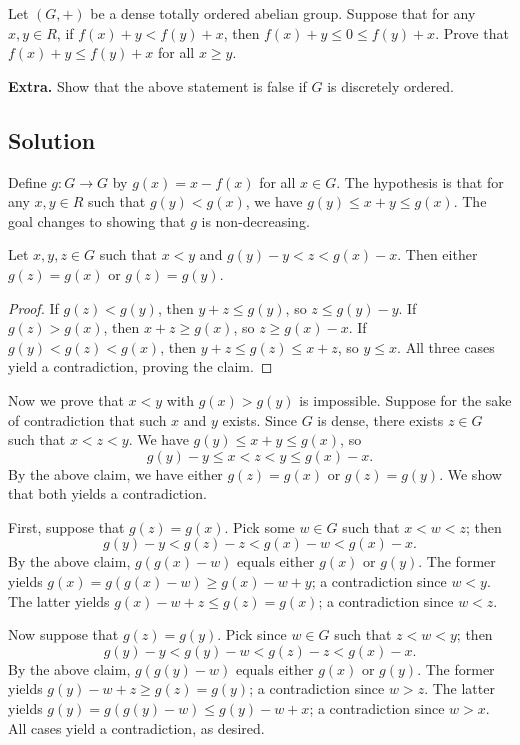 Let $(G, +)$ be a dense totally ordered abelian group.
Suppose that for any $x, y \in R$, if $f(x) + y < f(y) + x$, then $f(x) + y \leq 0 \leq f(y) + x$.
Prove that $f(x) + y \leq f(y) + x$ for all $x \geq y$.

\textbf{Extra.} Show that the above statement is false if $G$ is discretely ordered.



\subsection*{Solution}

Define $g : G \to G$ by $g(x) = x - f(x)$ for all $x \in G$.
The hypothesis is that for any $x, y \in R$ such that $g(y) < g(x)$, we have $g(y) \leq x + y \leq g(x)$.
The goal changes to showing that $g$ is non-decreasing.

\begin{claim}
Let $x, y, z \in G$ such that $x < y$ and $g(y) - y < z < g(x) - x$.
Then either $g(z) = g(x)$ or $g(z) = g(y)$.
\end{claim}
\begin{proof}
If $g(z) < g(y)$, then $y + z \leq g(y)$, so $z \leq g(y) - y$.
If $g(z) > g(x)$, then $x + z \geq g(x)$, so $z \geq g(x) - x$.
If $g(y) < g(z) < g(x)$, then $y + z \leq g(z) \leq x + z$, so $y \leq x$.
All three cases yield a contradiction, proving the claim.
\end{proof}

Now we prove that $x < y$ with $g(x) > g(y)$ is impossible.
Suppose for the sake of contradiction that such $x$ and $y$ exists.
Since $G$ is dense, there exists $z \in G$ such that $x < z < y$.
We have $g(y) \leq x + y \leq g(x)$, so
\[ g(y) - y \leq x < z < y \leq g(x) - x. \]
By the above claim, we have either $g(z) = g(x)$ or $g(z) = g(y)$.
We show that both yields a contradiction.

First, suppose that $g(z) = g(x)$.
Pick some $w \in G$ such that $x < w < z$; then
\[ g(y) - y < g(z) - z < g(x) - w < g(x) - x. \]
By the above claim, $g(g(x) - w)$ equals either $g(x)$ or $g(y)$.
The former yields $g(x) = g(g(x) - w) \geq g(x) - w + y$; a contradiction since $w < y$.
The latter yields $g(x) - w + z \leq g(z) = g(x)$; a contradiction since $w < z$.

Now suppose that $g(z) = g(y)$.
Pick since $w \in G$ such that $z < w < y$; then
\[ g(y) - y < g(y) - w < g(z) - z < g(x) - x. \]
By the above claim, $g(g(y) - w)$ equals either $g(x)$ or $g(y)$.
The former yields $g(y) - w + z \geq g(z) = g(y)$; a contradiction since $w > z$.
The latter yields $g(y) = g(g(y) - w) \leq g(y) - w + x$; a contradiction since $w > x$.
All cases yield a contradiction, as desired.



